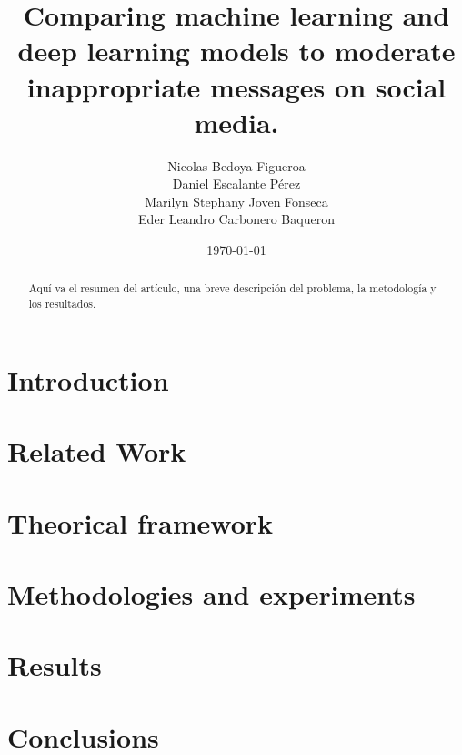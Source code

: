 \documentclass[conference]{IEEEtran}
\title{Comparing machine learning and deep learning models to moderate inappropriate messages on social media.}
\author{Nicolas Bedoya Figueroa \\
Daniel Escalante Pérez \\
Marilyn Stephany Joven Fonseca \\
Eder Leandro Carbonero Baqueron \\}
\date{\today}
\begin{document}
\maketitle
\begin{abstract}
Aquí va el resumen del artículo, una breve descripción del problema, la metodología y los resultados.
\end{abstract}

\section{Introduction}


\section{Related Work}


\section{Theorical framework}


\section{Methodologies and experiments}
\label{sec:methodologies}


\section{Results}


\section{Conclusions}




\end{document}
